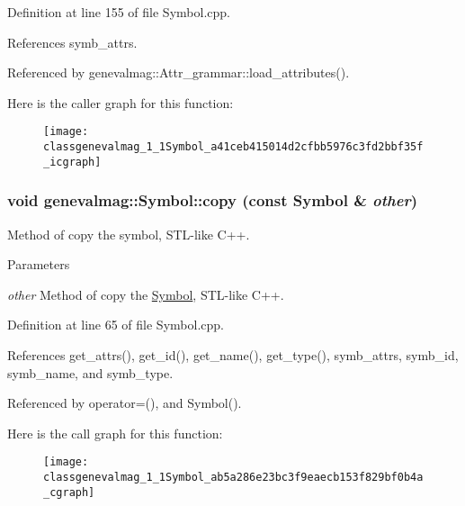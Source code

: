 Definition at line 155 of file Symbol.cpp.



References symb\_\-attrs.



Referenced by genevalmag::Attr\_\-grammar::load\_\-attributes().



Here is the caller graph for this function:\nopagebreak
\begin{figure}[H]
\begin{center}
\leavevmode
\texttt{[image: classgenevalmag\_1\_1Symbol\_a41ceb415014d2cfbb5976c3fd2bbf35f\_icgraph]}
\end{center}
\end{figure}


\hypertarget{classgenevalmag_1_1Symbol_ab5a286e23bc3f9eaecb153f829bf0b4a}{
\subsubsection[{copy}]{\setlength{\rightskip}{0pt plus 5cm}void genevalmag::Symbol::copy (const {\bf Symbol} \& {\em other})}}
\label{classgenevalmag_1_1Symbol_ab5a286e23bc3f9eaecb153f829bf0b4a}
Method of copy the symbol, STL-\/like C++. 
\begin{DoxyParams}{Parameters}
\item[{\em other}]Method of copy the \hyperlink{classgenevalmag_1_1Symbol}{Symbol}, STL-\/like C++. \end{DoxyParams}


Definition at line 65 of file Symbol.cpp.



References get\_\-attrs(), get\_\-id(), get\_\-name(), get\_\-type(), symb\_\-attrs, symb\_\-id, symb\_\-name, and symb\_\-type.



Referenced by operator=(), and Symbol().



Here is the call graph for this function:\nopagebreak
\begin{figure}[H]
\begin{center}
\leavevmode
\texttt{[image: classgenevalmag\_1\_1Symbol\_ab5a286e23bc3f9eaecb153f829bf0b4a\_cgraph]}
\end{center}
\end{figure}




